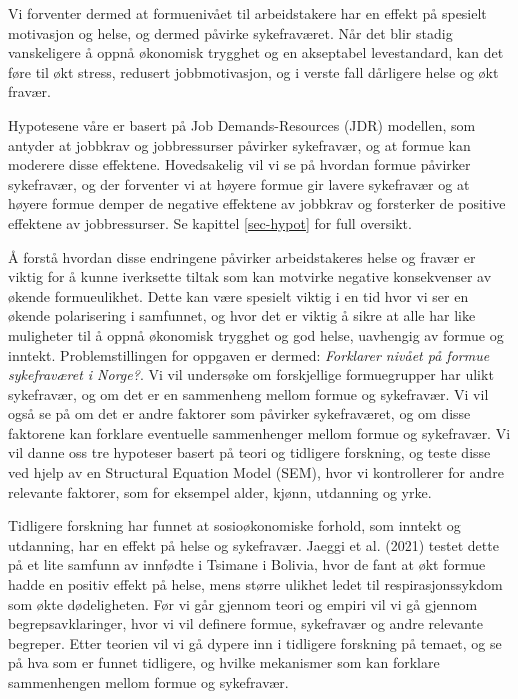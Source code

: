 \documentclass[
  12pt,
  a4paper,
  DIV=11,
  numbers=noendperiod]{scrartcl}
\begin{document}
Vi forventer dermed at formuenivået til arbeidstakere har en effekt på
spesielt motivasjon og helse, og dermed påvirke sykefraværet. Når det
blir stadig vanskeligere å oppnå økonomisk trygghet og en akseptabel
levestandard, kan det føre til økt stress, redusert jobbmotivasjon, og i
verste fall dårligere helse og økt fravær.

Hypotesene våre er basert på Job Demands-Resources (JDR) modellen, som
antyder at jobbkrav og jobbressurser påvirker sykefravær, og at formue
kan moderere disse effektene. Hovedsakelig vil vi se på hvordan formue
påvirker sykefravær, og der forventer vi at høyere formue gir lavere
sykefravær og at høyere formue demper de negative effektene av jobbkrav
og forsterker de positive effektene av jobbressurser. Se kapittel
\ref{sec-hypot} for full oversikt.

Å forstå hvordan disse endringene påvirker arbeidstakeres helse og
fravær er viktig for å kunne iverksette tiltak som kan motvirke negative
konsekvenser av økende formueulikhet. Dette kan være spesielt viktig i
en tid hvor vi ser en økende polarisering i samfunnet, og hvor det er
viktig å sikre at alle har like muligheter til å oppnå økonomisk
trygghet og god helse, uavhengig av formue og inntekt. Problemstillingen
for oppgaven er dermed: \emph{Forklarer nivået på formue sykefraværet i
Norge?}. Vi vil undersøke om forskjellige formuegrupper har ulikt
sykefravær, og om det er en sammenheng mellom formue og sykefravær. Vi
vil også se på om det er andre faktorer som påvirker sykefraværet, og om
disse faktorene kan forklare eventuelle sammenhenger mellom formue og
sykefravær. Vi vil danne oss tre hypoteser basert på teori og tidligere
forskning, og teste disse ved hjelp av en Structural Equation Model
(SEM), hvor vi kontrollerer for andre relevante faktorer, som for
eksempel alder, kjønn, utdanning og yrke.

Tidligere forskning har funnet at sosioøkonomiske forhold, som inntekt
og utdanning, har en effekt på helse og sykefravær. Jaeggi et al. (2021)
testet dette på et lite samfunn av innfødte i Tsimane i Bolivia, hvor de
fant at økt formue hadde en positiv effekt på helse, mens større ulikhet
ledet til respirasjonssykdom som økte dødeligheten. Før vi går gjennom
teori og empiri vil vi gå gjennom begrepsavklaringer, hvor vi vil
definere formue, sykefravær og andre relevante begreper. Etter teorien
vil vi gå dypere inn i tidligere forskning på temaet, og se på hva som
er funnet tidligere, og hvilke mekanismer som kan forklare sammenhengen
mellom formue og sykefravær.
\end{document}

